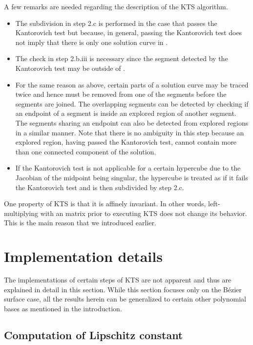 \documentclass{article}
\begin{document}
A few remarks are needed regarding the description of the KTS
algorithm.
\begin{itemize}
\item The subdivision in step 2.c is performed in the case that
 passes the Kantorovich test but  because,
in general, passing the Kantorovich test does not imply that there
is only one solution curve in .

\item The check in step 2.b.iii is necessary since the segment detected
by the Kantorovich test may be outside of .

\item For the same reason as above, certain parts of a solution curve may be traced twice and hence must be removed
from one of the segments before the segments are joined.  The
overlapping segments can be detected by checking if an endpoint of
a segment is inside an explored region of another segment.  The
segments sharing an endpoint can also be detected from explored
regions in a similar manner.  Note that there is no ambiguity in this
step because an explored region, having passed the Kantorovich test,
cannot contain more than one connected component of the solution.

\item If the Kantorovich test is not applicable for a certain
hypercube due to the Jacobian of the midpoint being singular, the
hypercube is treated as if it fails the Kantorovich test and is then subdivided by step 2.c.
\end{itemize}

One property of KTS is that it is affinely invariant.  In other
words, left-multiplying  with an  matrix  prior to
executing KTS does not change its behavior. This is the main
reason that we introduced  earlier.




\section{Implementation details}
\label{sec:impdetails}

The implementations of certain steps of KTS are not apparent and thus
are explained in detail in this section.  While this
section focuses only on the B\'{e}zier surface case,
all the results herein can be generalized to certain other polynomial
bases as mentioned in the introduction.



\subsection{Computation of Lipschitz constant}
\label{section_implip}
\end{document}
